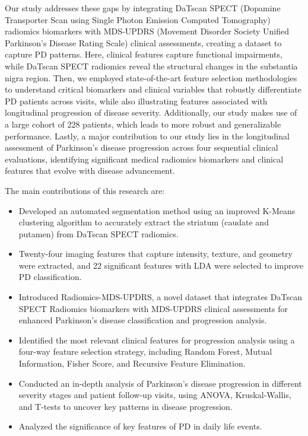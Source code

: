 \documentclass[twocolumn]{article}
\begin{document}
Our study addresses these gaps by integrating DaTscan SPECT (Dopamine Transporter Scan using Single Photon Emission Computed Tomography) radiomics biomarkers with MDS-UPDRS (Movement Disorder Society Unified Parkinson’s Disease Rating Scale) clinical assessments, creating a dataset to capture PD patterns. Here, clinical features capture functional impairments, while DaTscan SPECT radiomics reveal the structural changes in the substantia nigra region. Then, we employed state-of-the-art feature selection methodologies to understand critical biomarkers and clinical variables that robustly differentiate PD patients across visits, while also illustrating features associated with longitudinal progression of disease severity. Additionally, our study makes use of a large cohort of 228 patients, which leads to more robust and generalizable performance. Lastly, a major contribution to our study lies in the longitudinal assessment of Parkinson's disease progression across four sequential clinical evaluations, identifying significant medical radiomics biomarkers and clinical features that evolve with disease advancement.

The main contributions of this research are:
\begin{itemize}
    \item Developed an automated segmentation method using an improved K-Means clustering algorithm to accurately extract the striatum (caudate and putamen) from DaTscan SPECT radiomics.
    \item Twenty-four imaging features that capture intensity, texture, and geometry were extracted, and 22 significant features with LDA were selected to improve PD classification.  
    \item Introduced Radiomics-MDS-UPDRS, a novel dataset that integrates DaTscan SPECT Radiomics biomarkers with MDS-UPDRS clinical assessments for enhanced Parkinson's disease classification and progression analysis.
    \item Identified the most relevant clinical features for progression analysis using a four-way feature selection strategy, including Random Forest, Mutual Information, Fisher Score, and Recursive Feature Elimination.
    \item Conducted an in-depth analysis of Parkinson's disease progression in different severity stages and patient follow-up visits, using ANOVA, Kruskal-Wallis, and T-tests to uncover key patterns in disease progression.
    \item Analyzed the significance of key features of PD in daily life events.
\end{itemize}
\end{document}
